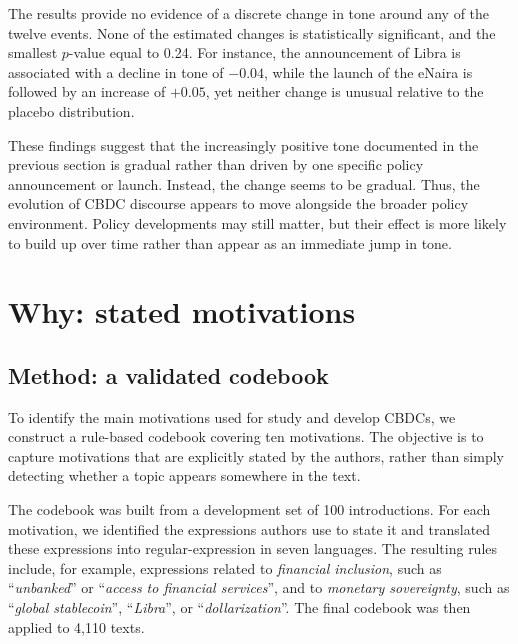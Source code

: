 \documentclass[11pt,a4paper]{article}
\begin{document}
The results provide no evidence of a discrete change in tone around any of the twelve events. None of the estimated changes is 
statistically significant, and the smallest \(p\)-value equal to 0.24. For instance, the announcement of Libra is associated 
with a decline in tone of  \(-0.04\), while the launch of the eNaira is followed by an increase of \(+0.05\), yet neither 
change is unusual relative to the placebo distribution.

These findings suggest that the increasingly positive tone documented in the previous section is gradual rather than driven 
by one specific policy announcement or launch. Instead, the change seems to be gradual. Thus, the evolution of CBDC discourse 
appears to move alongside the broader policy environment. Policy developments may still matter, but their effect is more likely 
to build up over time rather than appear as an immediate jump in tone.

\section{Why: stated motivations}\label{sec:why}
\subsection{Method: a validated codebook}
To identify the main motivations used for study and develop CBDCs, we construct a rule-based codebook covering ten motivations. 
The objective is to capture motivations that are explicitly stated by the authors, rather than simply detecting whether a topic 
appears somewhere in the text.

The codebook was built from a development set of 100 introductions. For each motivation, we  identified the expressions authors 
use to state it and translated these expressions into regular-expression in seven languages. The resulting rules include, 
for example, expressions related to \textit{financial inclusion}, such as “\textit{unbanked}” or “\textit{access to financial services}”, 
and to \textit{monetary sovereignty}, such as “\textit{global stablecoin}”, “\textit{Libra}”, or “\textit{dollarization}”. 
The final codebook was then applied to 4,110 texts. 
\end{document}
